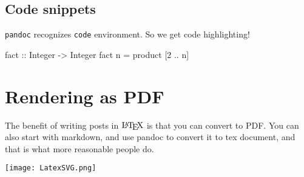 \subsection{Code snippets}

\texttt{pandoc} recognizes \texttt{code} environment. So we get code highlighting!

\begin{code}
fact :: Integer -> Integer
fact n = product [2 .. n]
\end{code}

\section{Rendering as PDF}

The benefit of writing posts in $\text{\LaTeX}$ is that you can convert to PDF.
You can also start with markdown, and use pandoc to convert it to tex document,
and that is what more reasonable people do.

\texttt{[image: LatexSVG.png]}


